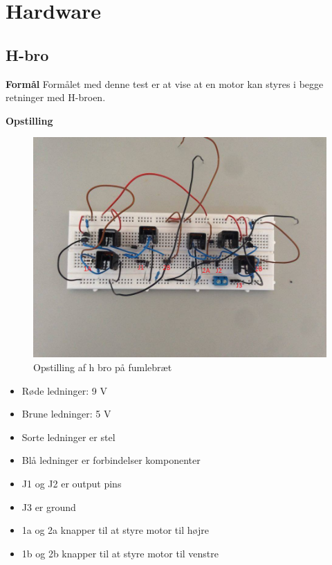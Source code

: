 \section{Hardware}
\subsection{H-bro} 

\textbf{Formål} \newline
Formålet med denne test er at vise at en motor kan styres i begge retninger med H-broen.\newline

\noindent \textbf{Opstilling}

\begin{figure}[H]
	\centering
	\includegraphics[width=\textwidth]{test/images/testhbroopst}
	\caption{Opstilling af h bro på fumlebræt}
\end{figure}

\begin{itemize}
	\item 	Røde ledninger: 9 V
	\item	Brune ledninger: 5 V
	\item	Sorte ledninger er stel
	\item	Blå ledninger er forbindelser komponenter
	\item	J1 og J2 er output pins 
	\item	J3 er ground
	\item	1a og 2a knapper til at styre motor til højre
	\item	1b og 2b knapper til at styre motor til venstre 	
\end{itemize}

